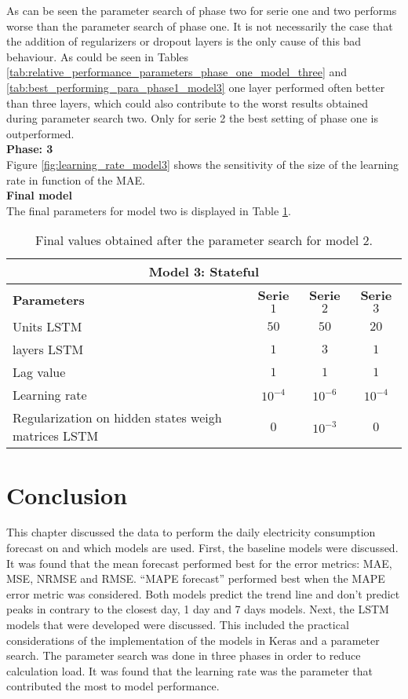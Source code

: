 As can be seen the parameter search of phase two for serie one and two performs worse than the parameter search of phase one. It is not necessarily the case that the addition of regularizers or dropout layers is the only cause of this bad behaviour. As could be seen in Tables \ref{tab:relative_performance_parameters_phase_one_model_three} and \ref{tab:best_performing_para_phase1_model3} one layer performed often better than three layers, which could also contribute to the worst results obtained during parameter search two. Only for serie 2 the best setting of phase one is outperformed. \\

\textbf{Phase: 3}\\
Figure \ref{fig:learning_rate_model3} shows the sensitivity of the size of the learning rate in function of the MAE.\\

\textbf{Final model}\\
The final parameters for model two is displayed in Table \ref{tab:final_model3}.

\begin{table}[h]
	\centering
	\begin{tabular}{@{}l|ccc@{}} \toprule
		\multicolumn{4}{c}{Model 3: Stateful}\\\midrule\midrule
		\textbf{Parameters}	& \textbf{Serie $ 1 $} & \textbf{Serie $ 2 $} & \textbf{Serie $ 3 $}\\\midrule
		Units LSTM & $50 $&$ 50 $  & $20 $\\
		layers LSTM & $1 $&$ 3 $  & $1$\\
		Lag value & $1 $&$ 1$  & $1$\\
		Learning rate & $10^{-4} $&$10^{-6} $  & $10^{-4} $\\\hline
		Regularization on hidden states weigh matrices LSTM  & $ 0 $ & $ 10^{-3} $ & $ 0 $\\\bottomrule
	\end{tabular}
	\caption{Final values obtained after the parameter search for model 2.}
	\label{tab:final_model3}
\end{table}




\section{Conclusion}
This chapter discussed the data to perform the daily electricity consumption forecast on and which models are used. First, the baseline models were discussed. It was found that the mean forecast performed best for the error metrics: MAE, MSE, NRMSE and RMSE. ``MAPE forecast'' performed best when the MAPE error metric was considered. Both models predict the trend line and don't predict peaks in contrary to the closest day, 1 day and 7 days models. Next, the LSTM models that were developed were discussed. This included the practical considerations of the implementation of the models in Keras and a parameter search. The parameter search was done in three phases in order to reduce calculation load. It was found that the learning rate was the parameter that contributed the most to model performance.


